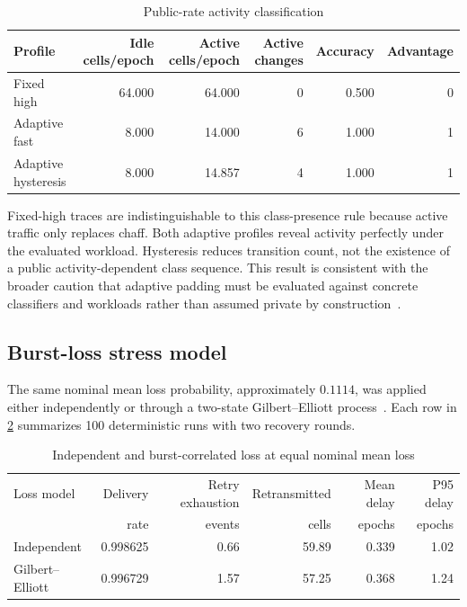 \documentclass[11pt,oneside]{article}
\begin{document}
\begin{table}[ht]
\centering
\caption{Public-rate activity classification}
\label{tab:t2leakage}
\begin{tabular}{@{}lrrrrr@{}}
\toprule
Profile & Idle cells/epoch & Active cells/epoch & Active changes & Accuracy & Advantage \\
\midrule
Fixed high & 64.000 & 64.000 & 0 & 0.500 & 0 \\
Adaptive fast & 8.000 & 14.000 & 6 & 1.000 & 1 \\
Adaptive hysteresis & 8.000 & 14.857 & 4 & 1.000 & 1 \\
\bottomrule
\end{tabular}
\end{table}

Fixed-high traces are indistinguishable to this class-presence rule because active traffic only replaces chaff. Both adaptive profiles reveal activity perfectly under the evaluated workload. Hysteresis reduces transition count, not the existence of a public activity-dependent class sequence. This result is consistent with the broader caution that adaptive padding must be evaluated against concrete classifiers and workloads rather than assumed private by construction~\cite{wtfpad}.

\subsection{Burst-loss stress model}

The same nominal mean loss probability, approximately $0.1114$, was applied either independently or through a two-state Gilbert--Elliott process~\cite{gilbert1960,elliott1963}. Each row in \cref{tab:t2burst} summarizes 100 deterministic runs with two recovery rounds.

\begin{table}[ht]
\centering
\caption{Independent and burst-correlated loss at equal nominal mean loss}
\label{tab:t2burst}
\begin{tabular}{@{}lrrrrr@{}}
\toprule
Loss model & Delivery & Retry exhaustion & Retransmitted & Mean delay & P95 delay \\
 & rate & events & cells & epochs & epochs \\
\midrule
Independent & 0.998625 & 0.66 & 59.89 & 0.339 & 1.02 \\
Gilbert--Elliott & 0.996729 & 1.57 & 57.25 & 0.368 & 1.24 \\
\bottomrule
\end{tabular}
\end{table}
\end{document}
